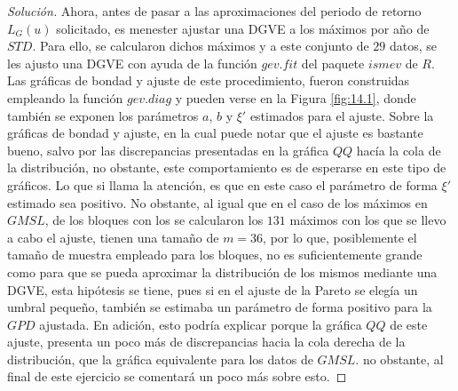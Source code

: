 \documentclass[10.5pt,notitlepage]{article}
\newenvironment{solucion}
  {\begin{proof}[Solución]}
  {\end{proof}}
\theoremstyle{plain}
\begin{document}
\begin{solucion}
Ahora, antes de pasar a las aproximaciones del periodo de retorno \(L_{G}(u)\) solicitado, es menester ajustar una DGVE a los máximos por año de \(STD\). Para ello, se calcularon dichos máximos y a este conjunto de \(29\) datos, se les ajusto una DGVE con ayuda de la función \(gev.fit\) del paquete \(ismev\) de \(R\). Las gráficas de bondad y ajuste de este procedimiento, fueron construidas empleando la función \(gev.diag\) y pueden verse en la Figura \ref{fig:14.1}, donde también se exponen los parámetros \(a\), \(b\) y \(\xi'\) estimados para el ajuste. Sobre la gráficas de bondad y ajuste, en la cual puede notar que el ajuste es bastante bueno, salvo por las discrepancias presentadas en la gráfica \(QQ\) hacía la cola de la distribución, no obstante, este comportamiento es de esperarse en este tipo de gráficos. Lo que si llama la atención, es que en este caso el parámetro de forma \(\xi'\) estimado sea positivo. No obstante, al igual que en el caso de los máximos en \(GMSL\), de los bloques con los se calcularon los \(131\) máximos con los que se llevo a cabo el ajuste, tienen una tamaño de \(m = 36\), por lo que, posiblemente el tamaño de muestra empleado para los bloques, no es suficientemente grande como para que se pueda aproximar la distribución de los mismos mediante una DGVE, esta hipótesis se tiene, pues si en el ajuste de la Pareto se elegía un umbral pequeño, también se estimaba un parámetro de forma positivo para la \(GPD\) ajustada. En adición, esto podría explicar porque la gráfica \(QQ\) de este ajuste, presenta un poco más de discrepancias hacia la cola derecha de la distribución, que la gráfica equivalente para los datos de \(GMSL\). no obstante, al final de este ejercicio se comentará un poco más sobre esto.


\end{solucion}
\end{document}
